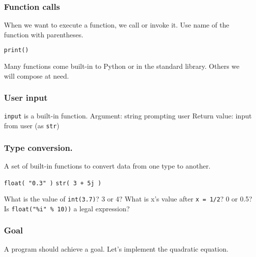 \documentclass[11pt]{beamer}
\begin{document}
\begin{frame}
  \frametitle{Function calls}
  \Enlarge

  \begin{itemize}
  \myitem  When we want to execute a function, we call or invoke it.
  \myitem  Use name of the function with parentheses.
    \begin{itemize}
    \mysubitem  \texttt{print()}
    \end{itemize}
  \myitem  Many functions come built-in to Python or in the standard library.
  \myitem  Others we will compose at need.
  \end{itemize}
\end{frame}

\begin{frame}
  \frametitle{User input}
  \Enlarge

  \begin{itemize}
  \myitem  \texttt{input} is a built-in function.
  \myitem  Argument:  string prompting user
  \myitem  Return value:  input from user (as \texttt{str})
  \end{itemize}
\end{frame}


\begin{frame}
	\frametitle{Type conversion.}
	\Enlarge
	
	\begin{itemize}
		\myitem  A set of built-in functions to convert data from one type to another. \pause
		\begin{itemize}
			\mysubitem  \texttt{float( "0.3" )}
			\mysubitem  \texttt{str( 3 + 5j )}
		\end{itemize} \pause
		\myitem What is the value of  \texttt{int(3.7)}? 3 or 4? \pause
		\myitem What is x's value after  \texttt{x = 1/2}? 0 or 0.5? \pause
    	\myitem Is \texttt{float("\%i"  \% 10))} a legal expression?  \pause
	\end{itemize}
\end{frame}

\begin{frame}
  \frametitle{Goal}
  \Enlarge

  \begin{itemize}
  \myitem  A program should achieve a goal. \pause
  \myitem  Let's implement the quadratic equation.
  \end{itemize}
\end{frame}
\end{document}
